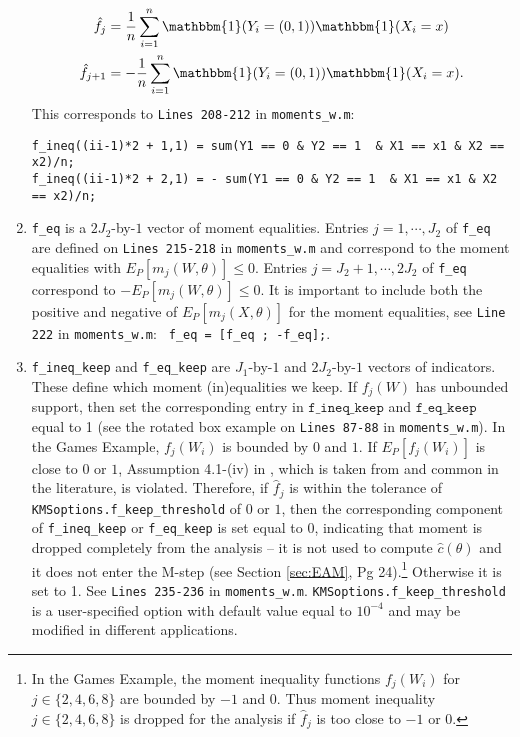 \documentclass[12pt]{article}
\def\code#1{\texttt{#1}}
\begin{document}
\begin{enumerate}
    \begin{align*}
  \hat  f_{j} & = \frac{1}{n} \sum_{i=1}^n \mathbbm{1}(Y_i = (0,1)) \mathbbm{1}(X_i = x) \\
   \hat f_{j+1} & = -\frac{1}{n} \sum_{i=1}^n \mathbbm{1}(Y_i = (0,1)) \mathbbm{1}(X_i = x).
    \end{align*}
    This corresponds to \code{Lines 208-212} in \code{moments\_w.m}:
    \footnotesize
    \begin{lstlisting}[backgroundcolor = \color{gray!30},
                   xleftmargin = 0cm,
                   framexleftmargin = 1em]
f_ineq((ii-1)*2 + 1,1) = sum(Y1 == 0 & Y2 == 1  & X1 == x1 & X2 == x2)/n;
f_ineq((ii-1)*2 + 2,1) = - sum(Y1 == 0 & Y2 == 1  & X1 == x1 & X2 == x2)/n;
    \end{lstlisting}\normalsize

    \item \code{f\_eq} is a $2 J_2$-by-$1$ vector of moment equalities.  Entries $j=1,\cdots,J_2$ of  \code{f\_eq} are defined on \code{Lines 215-218} in \code{moments\_w.m} and correspond to the moment equalities with $E_P[m_j(W,\theta)] \leq 0$.  Entries $j=J_2+1,\cdots,2J_2$ of  \code{f\_eq} correspond to  $-E_P[m_j(W,\theta)] \leq 0$.  It is important to include both the positive and negative of $E_P[m_j(X,\theta)]$ for the moment equalities, see \code{Line 222} in \code{moments\_w.m}: \code{ f\_eq = [f\_eq ; -f\_eq];}.

    \item  \code{f\_ineq\_keep} and  \code{f\_eq\_keep} are $J_1$-by-$1$ and $2 J_2$-by-$1$ vectors of indicators.  These define which moment (in)equalities we keep.  If $f_j(W)$ has unbounded support, then set the corresponding entry in $\code{f\_ineq\_keep}$ and $\code{f\_eq\_keep}$ equal to 1 (see the rotated box example on \code{Lines 87-88} in \code{moments\_w.m}).  In the Games Example, $f_j(W_i)$ is bounded by $0$ and $1$. If  $E_P[f_j(W_i)]$ is close to $0$ or $1$, Assumption 4.1-(iv) in , which is taken from  and common in the literature, is violated. Therefore, if $\hat f_{j}$ is within the tolerance of \code{KMSoptions.f\_keep\_threshold} of $0$ or $1$, then the corresponding component of  \code{f\_ineq\_keep} or \code{f\_eq\_keep} is set equal to 0, indicating that moment is dropped completely from the analysis -- it is not used to compute $\hat c(\theta)$ and it does not enter the M-step (see Section \ref{sec:EAM}, Pg 24).\footnote{In the Games Example, the moment inequality functions $f_j(W_i)$  for $j \in \{2,4,6,8\}$ are bounded by $-1$ and $0$.  Thus moment inequality $j  \in \{2,4,6,8\}$ is dropped for the analysis if $\hat f_j$ is too close to $-1$ or $0$.}   Otherwise it is set to 1.  See \code{Lines 235-236} in \code{moments\_w.m}.  \code{KMSoptions.f\_keep\_threshold} is a user-specified option with default value equal to $10^{-4}$ and may be modified in different applications.


\end{enumerate}
\end{document}
